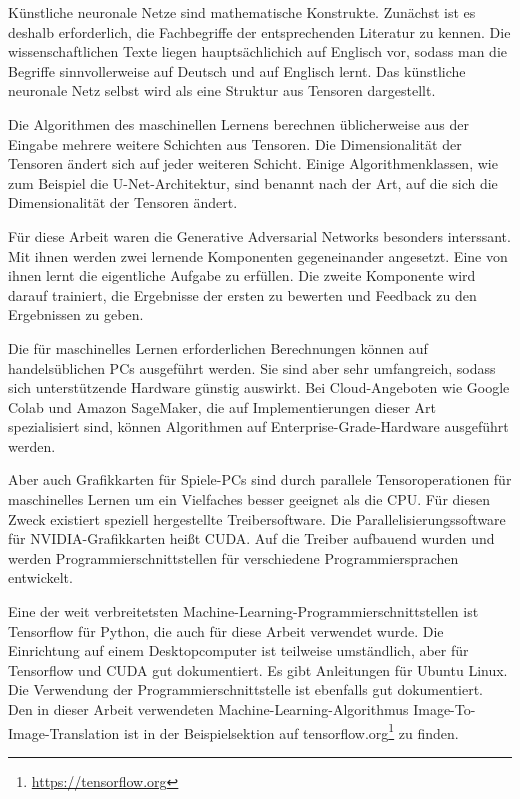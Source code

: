 Künstliche neuronale Netze sind mathematische Konstrukte. Zunächst ist es deshalb erforderlich, die Fachbegriffe der entsprechenden Literatur zu kennen. Die wissenschaftlichen Texte liegen hauptsächlichich auf Englisch vor, sodass man die Begriffe sinnvollerweise auf Deutsch und auf Englisch lernt. Das künstliche neuronale Netz selbst wird als eine Struktur aus Tensoren dargestellt.

Die Algorithmen des maschinellen Lernens berechnen üblicherweise aus der Eingabe mehrere weitere Schichten aus Tensoren. Die Dimensionalität der Tensoren ändert sich auf jeder weiteren Schicht. Einige Algorithmenklassen, wie zum Beispiel die U-Net-Architektur, sind benannt nach der Art, auf die sich die Dimensionalität der Tensoren ändert.

Für diese Arbeit waren die Generative Adversarial Networks besonders interssant. Mit ihnen werden zwei lernende Komponenten gegeneinander angesetzt. Eine von ihnen lernt die eigentliche Aufgabe zu erfüllen. Die zweite Komponente wird darauf trainiert, die Ergebnisse der ersten zu bewerten und Feedback zu den Ergebnissen zu geben.

Die für maschinelles Lernen erforderlichen Berechnungen können auf handelsüblichen PCs ausgeführt werden. Sie sind aber sehr umfangreich, sodass sich unterstützende Hardware günstig auswirkt. Bei Cloud-Angeboten wie Google Colab und Amazon SageMaker, die auf Implementierungen dieser Art spezialisiert sind, können Algorithmen auf Enterprise-Grade-Hardware ausgeführt werden.

Aber auch Grafikkarten für Spiele-PCs sind durch parallele Tensoroperationen für maschinelles Lernen um ein Vielfaches besser geeignet als die CPU. Für diesen Zweck existiert speziell hergestellte Treibersoftware. Die Parallelisierungssoftware für NVIDIA-Grafikkarten heißt CUDA. Auf die Treiber aufbauend wurden und werden Programmierschnittstellen für verschiedene Programmiersprachen entwickelt.

Eine der weit verbreitetsten Machine-Learning-Programmierschnittstellen ist Tensorflow für Python, die auch für diese Arbeit verwendet wurde. Die Einrichtung auf einem Desktopcomputer ist teilweise umständlich, aber für Tensorflow und CUDA gut dokumentiert. Es gibt Anleitungen für Ubuntu Linux. Die Verwendung der Programmierschnittstelle ist ebenfalls gut dokumentiert. Den in dieser Arbeit verwendeten Machine-Learning-Algorithmus Image-To-Image-Translation ist in der Beispielsektion auf tensorflow.org\footnote{\href{https://tensorflow.org}{https://tensorflow.org}} zu finden.

